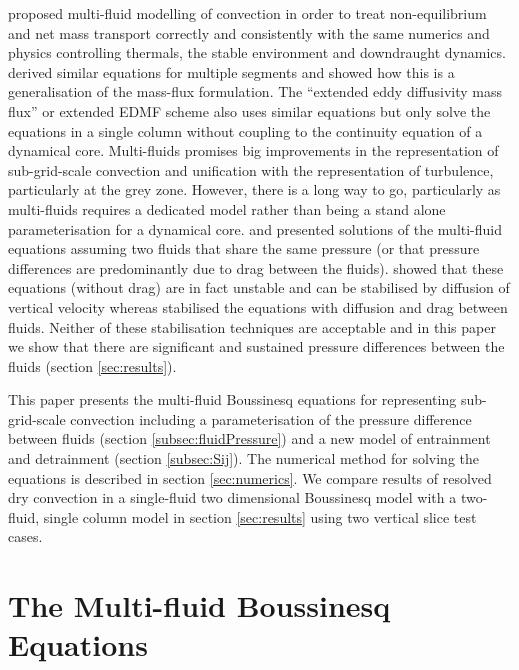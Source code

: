 \documentclass[draft]{agujournal2019}
\begin{document}
 proposed multi-fluid modelling of convection in order
to treat non-equilibrium and net mass transport correctly and consistently
with the same numerics and physics controlling thermals, the stable
environment and downdraught dynamics.  derived similar
equations for multiple segments and showed how this is a generalisation
of the mass-flux formulation. The  ``extended eddy
diffusivity mass flux'' or extended EDMF scheme also uses similar
equations but 
{only solve the equations in a single column without coupling to the continuity equation of a dynamical core.}
Multi-fluids promises big improvements
in the representation of sub-grid-scale convection and unification
with the representation of turbulence, particularly at the grey zone.
However, there is a long way to go, particularly as multi-fluids requires
a dedicated model rather than being a stand alone parameterisation
for a dynamical core.  and  presented solutions
of the multi-fluid equations assuming two fluids that share the same
pressure (or that pressure differences are predominantly due to drag
between the fluids).  showed that these equations (without
drag) are in fact unstable and can be stabilised by diffusion of vertical
velocity whereas  stabilised the equations with diffusion
and drag between fluids. Neither of these stabilisation techniques
are acceptable and in this paper we show that there are significant
and sustained pressure differences between the fluids (section \ref{sec:results}). 

This paper presents the multi-fluid Boussinesq equations for representing
sub-grid-scale convection including a parameterisation of the pressure
difference between fluids (section \ref{subsec:fluidPressure}) and
a new model of entrainment and detrainment (section \ref{subsec:Sij}).
The numerical method for solving the equations is described in section
\ref{sec:numerics}. We compare results of resolved dry convection
in a single-fluid two dimensional Boussinesq model with a two-fluid,
single column model in section \ref{sec:results} using two vertical
slice test cases.

\section{The Multi-fluid Boussinesq Equations}
\end{document}
